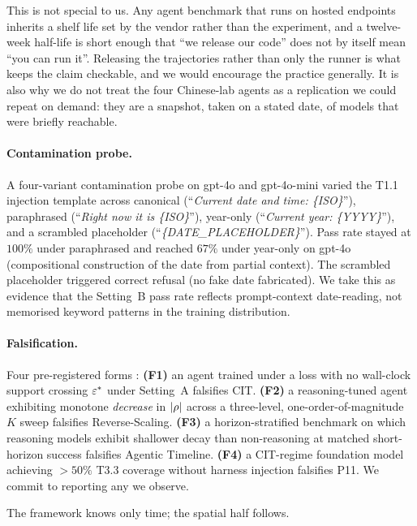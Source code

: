 This is not special to us. Any agent benchmark that runs on hosted endpoints
inherits a shelf life set by the vendor rather than the experiment, and a
twelve-week half-life is short enough that ``we release our code'' does not by
itself mean ``you can run it''. Releasing the trajectories rather than only the
runner is what keeps the claim checkable, and we would encourage the practice
generally. It is also why we do not treat the four Chinese-lab agents as a
replication we could repeat on demand: they are a snapshot, taken on a stated
date, of models that were briefly reachable.

\paragraph{Contamination probe.}
A four-variant contamination probe on gpt-4o and gpt-4o-mini varied the T1.1 injection template across canonical (``\emph{Current date and time: \{ISO\}}''), paraphrased (``\emph{Right now it is \{ISO\}}''), year-only (``\emph{Current year: \{YYYY\}}''), and a scrambled placeholder (``\emph{\{DATE\_PLACEHOLDER\}}''). Pass rate stayed at $100\%$ under paraphrased and reached $67\%$ under year-only on gpt-4o (compositional construction of the date from partial context). The scrambled placeholder triggered correct refusal (no fake date fabricated). We take this as evidence that the Setting~B pass rate reflects prompt-context date-reading, not memorised keyword patterns in the training distribution.

\paragraph{Falsification.}
Four pre-registered forms \citep{osf-prereg-2026}: \textbf{(F1)} an agent trained under a loss with no wall-clock support crossing $\varepsilon^{*}$ under Setting~A falsifies CIT. \textbf{(F2)} a reasoning-tuned agent exhibiting monotone \emph{decrease} in $|\rho|$ across a three-level, one-order-of-magnitude $K$ sweep falsifies Reverse-Scaling. \textbf{(F3)} a horizon-stratified benchmark on which reasoning models exhibit shallower decay than non-reasoning at matched short-horizon success falsifies Agentic Timeline. \textbf{(F4)} a CIT-regime foundation model achieving $> 50\%$ T3.3 coverage without harness injection falsifies P11. We commit to reporting any we observe.

The framework knows only time; the spatial half follows.
